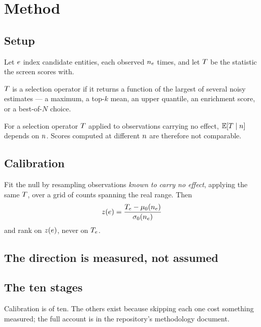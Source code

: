 \section{Method}
\label{sec:method}

\subsection{Setup}
Let $e$ index candidate entities, each observed $n_{e}$ times, and let $T$
be the statistic the screen scores with.

\begin{definition}
\label{def:selection}
$T$ is a selection operator if it returns a function of the largest of several noisy
estimates --- a maximum, a top-$k$ mean, an upper quantile, an enrichment score, or a
best-of-$N$ choice.
\end{definition}

\begin{proposition}
\label{prop:inflation}
For a selection operator $T$ applied to observations carrying no effect,
$\mathbb{E}[T \mid n]$ depends on $n$. Scores computed at different $n$ are therefore
not comparable.
\end{proposition}

\subsection{Calibration}
\label{sec:calibration}

Fit the null by resampling observations \emph{known to carry no effect}, applying the same
$T$, over a grid of counts spanning the real range. Then
\begin{equation}
\label{eq:z}
  z(e) = \frac{T_{e} - \mu_{0}(n_{e})}{\sigma_{0}(n_{e})}
\end{equation}
and rank on $z(e)$, never on $T_{e}$.

\subsection{The direction is measured, not assumed}
\label{sec:direction}


\subsection{The ten stages}
\label{sec:stages}

Calibration is  of ten. The others exist because skipping each one cost something
measured; the full account is in the repository's methodology document.
